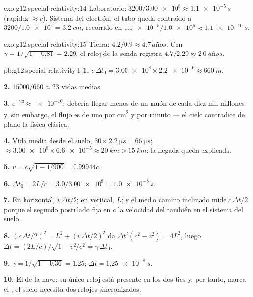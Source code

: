 \begin{solution}{exo:g12:special-relativity:14}
Laboratorio: $3200/\num{3.00e8} \approx \qty{1.1e-5}{s}$ (rapidez
$\approx c$). Sistema del electrón: el tubo queda contraído a
$3200/\num{1.0e5} = \qty{3.2}{cm}$, recorrido en
$\num{1.1e-5}/\num{1.0e5} \approx \qty{1.1e-10}{s}$.
\end{solution}

\begin{solution}{exo:g12:special-relativity:15}
Tierra: $4.2/0.9 \approx \qty{4.7}{años}$. Con
$\gamma = 1/\sqrt{1 - 0.81} = 2.29$, el reloj de la sonda registra
$4.7/2.29 \approx \qty{2.0}{años}$.
\end{solution}

\begin{solution}{pb:g12:special-relativity:1}
\textbf{1.} $c\,\Delta t_0 = \num{3.00e8} \times \num{2.2e-6} \approx
\qty{660}{m}$.

\textbf{2.} $\num{15000}/660 \approx 23$ vidas medias.

\textbf{3.} $\mathrm{e}^{-23} \approx \num{e-10}$: debería llegar menos
de un muón de cada diez mil millones y, sin embargo, el flujo es de uno
por \unit{cm^2} y por minuto --- el cielo contradice de plano la física
clásica.

\textbf{4.} Vida media desde el suelo,
$30 \times \qty{2.2}{\micro s} = \qty{66}{\micro s}$; 
$\approx \num{3.00e8} \times \num{6.6e-5} \approx \qty{20}{km} >
\qty{15}{km}$: la llegada queda explicada.

\textbf{5.} $v = c\sqrt{1 - 1/900} = 0.99944c$.

\textbf{6.} $\Delta t_0 = 2L/c = 3.0/\num{3.00e8} = \qty{1.0e-8}{s}$.

\textbf{7.} En horizontal, $v\,\Delta t/2$; en vertical, $L$; y el medio
camino inclinado mide $c\,\Delta t/2$ porque el segundo postulado fija
en $c$ la velocidad del  también en el sistema del suelo.

\textbf{8.} $(c\,\Delta t/2)^2 = L^2 + (v\,\Delta t/2)^2$ da
$\Delta t^2(c^2 - v^2) = 4L^2$, luego
$\Delta t = (2L/c)/\sqrt{1 - v^2/c^2} = \gamma\,\Delta t_0$.

\textbf{9.} $\gamma = 1/\sqrt{1 - 0.36} = 1.25$;
$\Delta t = \qty{1.25e-8}{s}$.

\textbf{10.} El de la nave: su único reloj está presente en los dos tics
y, por tanto, marca el ; el suelo necesita dos relojes
sincronizados.


\end{solution}
